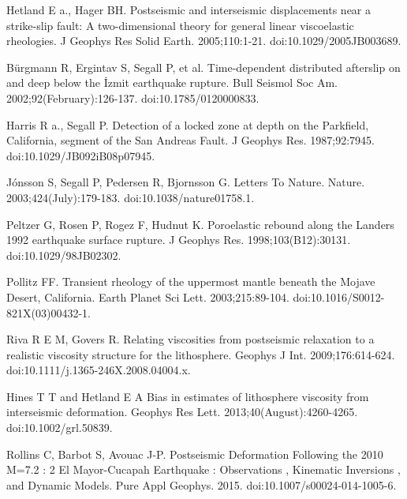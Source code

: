 \documentclass[12pt]{article}
\begin{document}
\begin{thebibliography}{}

 Hetland E a., Hager
  BH. Postseismic and interseismic displacements near a strike-slip
  fault: A two-dimensional theory for general linear viscoelastic
  rheologies. J Geophys Res Solid
  Earth. 2005;110:1-21. doi:10.1029/2005JB003689.

 B\"{u}rgmann R, Ergintav
  S, Segall P, et al. Time-dependent distributed afterslip on and deep
  below the İzmit earthquake rupture. Bull Seismol Soc
  Am. 2002;92(February):126-137. doi:10.1785/0120000833.

 Harris R a., Segall
  P. Detection of a locked zone at depth on the Parkfield, California,
  segment of the San Andreas Fault. J Geophys
  Res. 1987;92:7945. doi:10.1029/JB092iB08p07945.

 J\'onsson S, Segall P, Pedersen
  R, Bjornsson G. Letters To
  Nature. Nature. 2003;424(July):179-183. doi:10.1038/nature01758.1.

 Peltzer G, Rosen P,
  Rogez F, Hudnut K. Poroelastic rebound along the Landers 1992
  earthquake surface rupture. J Geophys
  Res. 1998;103(B12):30131. doi:10.1029/98JB02302.

 Pollitz FF. Transient rheology
  of the uppermost mantle beneath the Mojave Desert, California. Earth
  Planet Sci Lett. 2003;215:89-104. doi:10.1016/S0012-821X(03)00432-1.

 Riva R E M, Govers
  R. Relating viscosities from postseismic relaxation to a realistic
  viscosity structure for the lithosphere. Geophys J
  Int. 2009;176:614-624. doi:10.1111/j.1365-246X.2008.04004.x.

 Hines T T and
  Hetland E A Bias in estimates of lithosphere viscosity from
  interseismic deformation. Geophys Res
  Lett. 2013;40(August):4260-4265. doi:10.1002/grl.50839.

 Rollins C, Barbot S,
  Avouac J-P. Postseismic Deformation Following the 2010 M=7.2 : 2 El
  Mayor-Cucapah Earthquake : Observations , Kinematic Inversions , and
  Dynamic Models. Pure Appl
  Geophys. 2015. doi:10.1007/s00024-014-1005-6.


\end{thebibliography}
\end{document}
